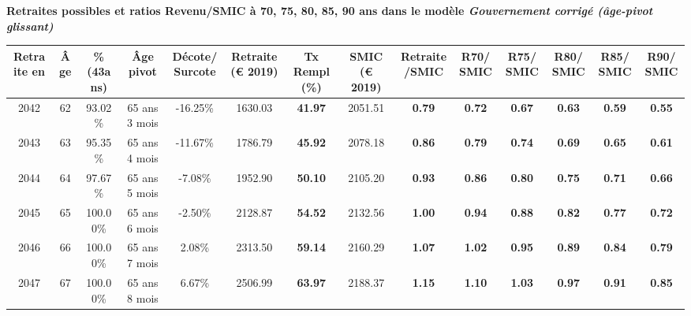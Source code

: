  \vspace{0.1cm} 
{\bf \noindent Retraites possibles et ratios Revenu/SMIC à 70, 75, 80, 85, 90 ans dans le modèle \emph{Gouvernement corrigé (âge-pivot glissant)}}  
 
\begin{adjustbox}{max width=\textwidth} 
\begin{tabular}[htb]{|c|c||c|c|c||c|c||c|c||c|c|c|c|c|} 
\hline 
 Retraite en &  Âge &  \%(43ans) &  Âge pivot &  Décote/Surcote &  Retraite (\euro{} 2019) &  Tx Rempl(\%) &  SMIC (\euro{} 2019) &  Retraite/SMIC &  R70/SMIC &  R75/SMIC &  R80/SMIC &  R85/SMIC &  R90/SMIC \\ 
\hline \hline 
 2042 &  62 &  93.02\% &  65 ans 3 mois &  -16.25\% &  1630.03 &  {\bf 41.97} &  2051.51 &  {\bf {\color{red} 0.79}} &  {\bf {\color{red} 0.72}} &  {\bf {\color{red} 0.67}} &  {\bf {\color{red} 0.63}} &  {\bf {\color{red} 0.59}} &  {\bf {\color{red} 0.55}} \\ 
\hline 
 2043 &  63 &  95.35\% &  65 ans 4 mois &  -11.67\% &  1786.79 &  {\bf 45.92} &  2078.18 &  {\bf {\color{red} 0.86}} &  {\bf {\color{red} 0.79}} &  {\bf {\color{red} 0.74}} &  {\bf {\color{red} 0.69}} &  {\bf {\color{red} 0.65}} &  {\bf {\color{red} 0.61}} \\ 
\hline 
 2044 &  64 &  97.67\% &  65 ans 5 mois &  -7.08\% &  1952.90 &  {\bf 50.10} &  2105.20 &  {\bf {\color{red} 0.93}} &  {\bf {\color{red} 0.86}} &  {\bf {\color{red} 0.80}} &  {\bf {\color{red} 0.75}} &  {\bf {\color{red} 0.71}} &  {\bf {\color{red} 0.66}} \\ 
\hline 
 2045 &  65 &  100.00\% &  65 ans 6 mois &  -2.50\% &  2128.87 &  {\bf 54.52} &  2132.56 &  {\bf {\color{red} 1.00}} &  {\bf {\color{red} 0.94}} &  {\bf {\color{red} 0.88}} &  {\bf {\color{red} 0.82}} &  {\bf {\color{red} 0.77}} &  {\bf {\color{red} 0.72}} \\ 
\hline 
 2046 &  66 &  100.00\% &  65 ans 7 mois &  2.08\% &  2313.50 &  {\bf 59.14} &  2160.29 &  {\bf 1.07} &  {\bf 1.02} &  {\bf {\color{red} 0.95}} &  {\bf {\color{red} 0.89}} &  {\bf {\color{red} 0.84}} &  {\bf {\color{red} 0.79}} \\ 
\hline 
 2047 &  67 &  100.00\% &  65 ans 8 mois &  6.67\% &  2506.99 &  {\bf 63.97} &  2188.37 &  {\bf 1.15} &  {\bf 1.10} &  {\bf 1.03} &  {\bf {\color{red} 0.97}} &  {\bf {\color{red} 0.91}} &  {\bf {\color{red} 0.85}} \\ 
\hline 
\hline 
\end{tabular} 
\end{adjustbox} 
 
